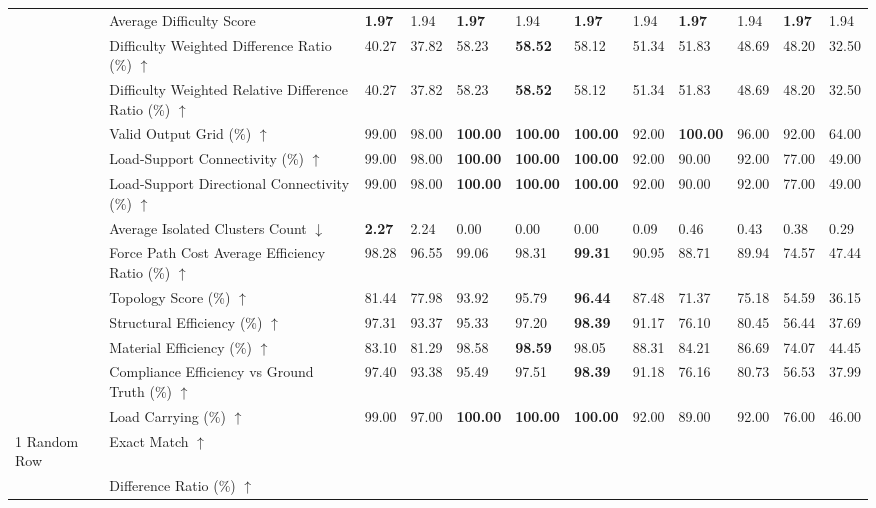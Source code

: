 \begin{table}[!h]
{\begin{tabular}{llllllllllll}
 & Average Difficulty Score & \textbf{1.97} & 1.94 & \textbf{1.97} & 1.94 & \textbf{1.97} & 1.94 & \textbf{1.97} & 1.94 & \textbf{1.97} & 1.94 \\
 & Difficulty Weighted Difference Ratio (\%) $\uparrow$ & 40.27 & 37.82 & 58.23 & \textbf{58.52} & 58.12 & 51.34 & 51.83 & 48.69 & 48.20 & 32.50 \\
 & Difficulty Weighted Relative Difference Ratio (\%) $\uparrow$ & 40.27 & 37.82 & 58.23 & \textbf{58.52} & 58.12 & 51.34 & 51.83 & 48.69 & 48.20 & 32.50 \\
 & Valid Output Grid (\%) $\uparrow$ & 99.00 & 98.00 & \textbf{100.00} & \textbf{100.00} & \textbf{100.00} & 92.00 & \textbf{100.00} & 96.00 & 92.00 & 64.00 \\
 & Load-Support Connectivity (\%) $\uparrow$ & 99.00 & 98.00 & \textbf{100.00} & \textbf{100.00} & \textbf{100.00} & 92.00 & 90.00 & 92.00 & 77.00 & 49.00 \\
 & Load-Support Directional Connectivity (\%) $\uparrow$ & 99.00 & 98.00 & \textbf{100.00} & \textbf{100.00} & \textbf{100.00} & 92.00 & 90.00 & 92.00 & 77.00 & 49.00 \\
 & Average Isolated Clusters Count $\downarrow$ & \textbf{2.27} & 2.24 & 0.00 & 0.00 & 0.00 & 0.09 & 0.46 & 0.43 & 0.38 & 0.29 \\
 & Force Path Cost Average Efficiency Ratio (\%) $\uparrow$ & 98.28 & 96.55 & 99.06 & 98.31 & \textbf{99.31} & 90.95 & 88.71 & 89.94 & 74.57 & 47.44 \\
 & Topology Score (\%) $\uparrow$ & 81.44 & 77.98 & 93.92 & 95.79 & \textbf{96.44} & 87.48 & 71.37 & 75.18 & 54.59 & 36.15 \\
 & Structural Efficiency (\%) $\uparrow$ & 97.31 & 93.37 & 95.33 & 97.20 & \textbf{98.39} & 91.17 & 76.10 & 80.45 & 56.44 & 37.69 \\
 & Material Efficiency (\%) $\uparrow$ & 83.10 & 81.29 & 98.58 & \textbf{98.59} & 98.05 & 88.31 & 84.21 & 86.69 & 74.07 & 44.45 \\
 & Compliance Efficiency vs Ground Truth (\%) $\uparrow$ & 97.40 & 93.38 & 95.49 & 97.51 & \textbf{98.39} & 91.18 & 76.16 & 80.73 & 56.53 & 37.99 \\
 & Load Carrying (\%) $\uparrow$ & 99.00 & 97.00 & \textbf{100.00} & \textbf{100.00} & \textbf{100.00} & 92.00 & 89.00 & 92.00 & 76.00 & 46.00 \\
1 Random Row & Exact Match $\uparrow$ &  &  &  &  &  &  &  &  &  &  \\
 & Difference Ratio (\%) $\uparrow$ &  &  &  &  &  &  &  &  &  &  \\

\end{tabular}}
\end{table}
